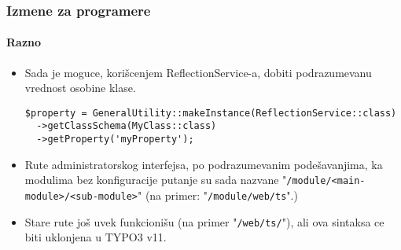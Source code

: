 \begin{frame}[fragile]
	\frametitle{Izmene za programere}
	\framesubtitle{Razno}

	\lstset{basicstyle=\tiny\ttfamily}

	\begin{itemize}
		\item Sada je moguce, korišcenjem ReflectionService-a, dobiti podrazumevanu vrednost
			osobine klase.


\begin{lstlisting}
$property = GeneralUtility::makeInstance(ReflectionService::class)
  ->getClassSchema(MyClass::class)
  ->getProperty('myProperty');
\end{lstlisting}

		\item Rute administratorskog interfejsa, po podrazumevanim podešavanjima, ka modulima bez konfiguracije putanje su sada nazvane\newline
			"\texttt{/module/<main-module>/<sub-module>}"\newline
			\small
				(na primer: "\texttt{/module/web/ts}".)
			\normalsize

		\item Stare rute još uvek funkcionišu (na primer "\texttt{/web/ts/}"), ali ova sintaksa ce biti uklonjena u TYPO3 v11.

	\end{itemize}

\end{frame}


